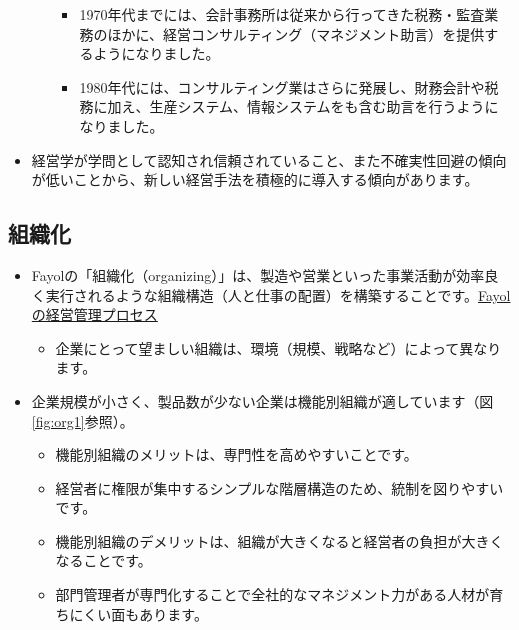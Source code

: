 \documentclass[
]{book}
\providecommand{\tightlist}{%
  \setlength{\itemsep}{0pt}\setlength{\parskip}{0pt}}
\begin{document}
\begin{itemize}
\begin{itemize}
    \begin{itemize}
    \item
      1970年代までには、会計事務所は従来から行ってきた税務・監査業務のほかに、経営コンサルティング（マネジメント助言）を提供するようになりました。
    \item
      1980年代には、コンサルティング業はさらに発展し、財務会計や税務に加え、生産システム、情報システムをも含む助言を行うようになりました。
    \end{itemize}
  \end{itemize}
\item
  経営学が学問として認知され信頼されていること、また不確実性回避の傾向が低いことから、新しい経営手法を積極的に導入する傾向があります。
\end{itemize}

\hypertarget{us-organization}{%
\subsection{組織化}\label{us-organization}}

\begin{itemize}
\item
  Fayolの「組織化（organizing）」は、製造や営業といった事業活動が効率良く実行されるような組織構造（人と仕事の配置）を構築することです。\protect\hyperlink{fayol}{Fayolの経営管理プロセス}

  \begin{itemize}
  \tightlist
  \item
    企業にとって望ましい組織は、環境（規模、戦略など）によって異なります。
  \end{itemize}
\item
  企業規模が小さく、製品数が少ない企業は機能別組織が適しています（図\ref{fig:org1}参照）。

  \begin{itemize}
  \item
    機能別組織のメリットは、専門性を高めやすいことです。
  \item
    経営者に権限が集中するシンプルな階層構造のため、統制を図りやすいです。
  \item
    機能別組織のデメリットは、組織が大きくなると経営者の負担が大きくなることです。
  \item
    部門管理者が専門化することで全社的なマネジメント力がある人材が育ちにくい面もあります。
  \end{itemize}
\end{itemize}
\end{document}
